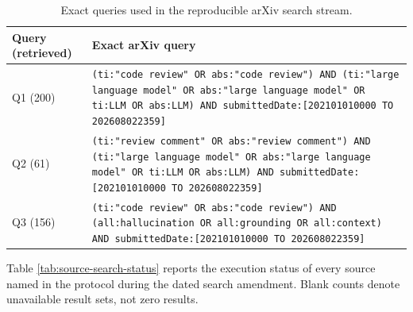 \documentclass[10pt]{article}
\begin{document}
\begin{table}[H]
\centering
\caption{Exact queries used in the reproducible arXiv search stream.}
\label{tab:arxiv-queries}
\footnotesize
\renewcommand{\arraystretch}{1.18}
\begin{tabularx}{\linewidth}{@{}>{\raggedright\arraybackslash}p{0.9in}>{\raggedright\arraybackslash}X@{}}
\toprule
\rowcolor{ACMTableHead}
\textbf{Query (retrieved)} & \textbf{Exact arXiv query} \\
\midrule
Q1 (200) & \texttt{(ti:"code review" OR abs:"code review") AND (ti:"large language model" OR abs:"large language model" OR ti:LLM OR abs:LLM) AND submittedDate:[202101010000 TO 202608022359]} \\
Q2 (61) & \texttt{(ti:"review comment" OR abs:"review comment") AND (ti:"large language model" OR abs:"large language model" OR ti:LLM OR abs:LLM) AND submittedDate:[202101010000 TO 202608022359]} \\
Q3 (156) & \texttt{(ti:"code review" OR abs:"code review") AND (all:hallucination OR all:grounding OR all:context) AND submittedDate:[202101010000 TO 202608022359]} \\
\bottomrule
\end{tabularx}
\end{table}

Table \ref{tab:source-search-status} reports the execution status of every source named in the protocol during the dated search amendment. Blank counts denote unavailable result sets, not zero results.
\end{document}
